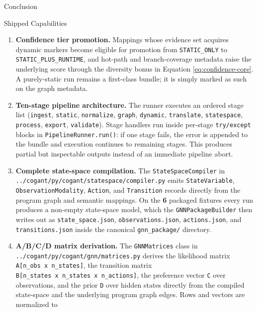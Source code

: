 \documentclass[
  ignorenonframetext,
]{beamer}
\begin{document}
\begin{frame}[fragile]{Conclusion}
\begin{block}{Shipped Capabilities}
\begin{enumerate}
  to the program graph's evidence sources. The \texttt{dynamic} stage is
  part of the default pipeline stage list in
  \texttt{cogant/py/cogant/api/pipeline.py}, and the shipped CLI exposes
  a \texttt{-\/-no-dynamic} flag (handled by
  \texttt{PipelineConfig.skip\_dynamic}) for scripted runs that must
  force a purely-static bundle.
\item
  \textbf{Confidence tier promotion.} Mappings whose evidence set
  acquires dynamic markers become eligible for promotion from
  \texttt{STATIC\_ONLY} to \texttt{STATIC\_PLUS\_RUNTIME}, and hot-path
  and branch-coverage metadata raise the underlying score through the
  diversity bonus in Equation \ref{eq:confidence-core}. A purely-static
  run remains a first-class bundle; it is simply marked as such on the
  graph metadata.
\item
  \textbf{Ten-stage pipeline architecture.} The runner executes an
  ordered stage list (\texttt{ingest}, \texttt{static},
  \texttt{normalize}, \texttt{graph}, \texttt{dynamic},
  \texttt{translate}, \texttt{statespace}, \texttt{process},
  \texttt{export}, \texttt{validate}). Stage handlers run inside
  per-stage \texttt{try/except} blocks in \texttt{PipelineRunner.run()}:
  if one stage fails, the error is appended to the bundle and execution
  continues to remaining stages. This produces partial but inspectable
  outputs instead of an immediate pipeline abort.
\item
  \textbf{Complete state-space compilation.} The
  \texttt{StateSpaceCompiler} in
  \texttt{../cogant/py/cogant/statespace/compiler.py} emits
  \texttt{StateVariable}, \texttt{ObservationModality}, \texttt{Action},
  and \texttt{Transition} records directly from the program graph and
  semantic mappings. On the \textbf{6} packaged fixtures every run
  produces a non-empty state-space model, which the
  \texttt{GNNPackageBuilder} then writes out as
  \texttt{state\_space.json}, \texttt{observations.json},
  \texttt{actions.json}, and \texttt{transitions.json} inside the
  canonical \texttt{gnn\_package/} directory.
\item
  \textbf{A/B/C/D matrix derivation.} The \texttt{GNNMatrices} class in
  \texttt{../cogant/py/cogant/gnn/matrices.py} derives the likelihood
  matrix \texttt{A{[}n\_obs\ x\ n\_states{]}}, the transition matrix
  \texttt{B{[}n\_states\ x\ n\_states\ x\ n\_actions{]}}, the preference
  vector \texttt{C} over observations, and the prior \texttt{D} over
  hidden states directly from the compiled state-space and the
  underlying program graph edges. Rows and vectors are normalized to

\end{enumerate}
\end{block}
\end{frame}
\end{document}
